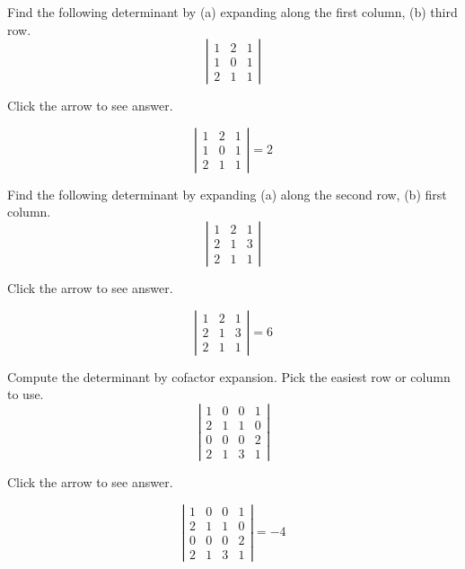 \documentclass{ximera}
\begin{document}
\begin{problem}\label{prb:7.5} Find the following determinant by (a) expanding along the first column, (b)
third row.
\begin{equation*}
\left|
\begin{array}{rrr}
1 & 2 & 1 \\
1 & 0 & 1 \\
2 & 1 & 1
\end{array}
\right|
\end{equation*}

Click the arrow to see answer.
\begin{expandable}
\[
\left|
\begin{array}{ccc}
1 & 2 & 1 \\
1 & 0 & 1 \\
2 & 1 & 1
\end{array}
\right| =  2
\]
\end{expandable}
\end{problem}

\begin{problem}\label{prb:7.6} Find the following determinant by expanding (a) along the second row, (b)
first column.
\begin{equation*}
\left|
\begin{array}{rrr}
1 & 2 & 1 \\
2 & 1 & 3 \\
2 & 1 & 1
\end{array}
\right|
\end{equation*}

Click the arrow to see answer.
\begin{expandable}
\[
\left|
\begin{array}{ccc}
1 & 2 & 1 \\
2 & 1 & 3 \\
2 & 1 & 1
\end{array}
\right| = 6
\]
\end{expandable}
\end{problem}

\begin{problem}\label{prb:7.7} Compute the determinant by cofactor expansion. Pick the easiest row or
column to use.
\begin{equation*}
\left|
\begin{array}{rrrr}
1 & 0 & 0 & 1 \\
2 & 1 & 1 & 0 \\
0 & 0 & 0 & 2 \\
2 & 1 & 3 & 1
\end{array}
\right|
\end{equation*}

Click the arrow to see answer.
\begin{expandable}
\[
\left|
\begin{array}{cccc}
1 & 0 & 0 & 1 \\
2 & 1 & 1 & 0 \\
0 & 0 & 0 & 2 \\
2 & 1 & 3 & 1
\end{array}
\right| = -4
\]
\end{expandable}
\end{problem}
\end{document}

